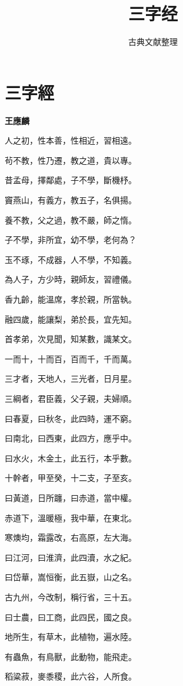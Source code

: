 \documentclass[12pt,a4paper]{ctexbook}
\title{三字经}
\author{古典文献整理}
\date{}
\begin{document}
\maketitle
\tableofcontents
\newpage
\section{三字經}
\textbf{王應麟}\par\vspace{0.5em}
人之初，性本善，性相近，習相遠。\par
茍不教，性乃遷，教之道，貴以專。\par
昔孟母，擇鄰處，子不學，斷機杼。\par
竇燕山，有義方，教五子，名俱揚。\par
養不教，父之過，教不嚴，師之惰。\par
子不學，非所宜，幼不學，老何為？\par
玉不琢，不成器，人不學，不知義。\par
為人子，方少時，親師友，習禮儀。\par
香九齡，能溫席，孝於親，所當執。\par
融四歲，能讓梨，弟於長，宜先知。\par
首孝弟，次見聞，知某數，識某文。\par
一而十，十而百，百而千，千而萬。\par
三才者，天地人，三光者，日月星。\par
三綱者，君臣義，父子親，夫婦順。\par
曰春夏，曰秋冬，此四時，運不窮。\par
曰南北，曰西東，此四方，應乎中。\par
曰水火，木金土，此五行，本乎數。\par
十幹者，甲至癸，十二支，子至亥。\par
曰黃道，日所躔，曰赤道，當中權。\par
赤道下，溫暖極，我中華，在東北。\par
寒燠均，霜露改，右高原，左大海。\par
曰江河，曰淮濟，此四瀆，水之紀。\par
曰岱華，嵩恒衡，此五嶽，山之名。\par
古九州，今改制，稱行省，三十五。\par
曰士農，曰工商，此四民，國之良。\par
地所生，有草木，此植物，遍水陸。\par
有蟲魚，有鳥獸，此動物，能飛走。\par
稻粱菽，麥黍稷，此六谷，人所食。\par
\end{document}
